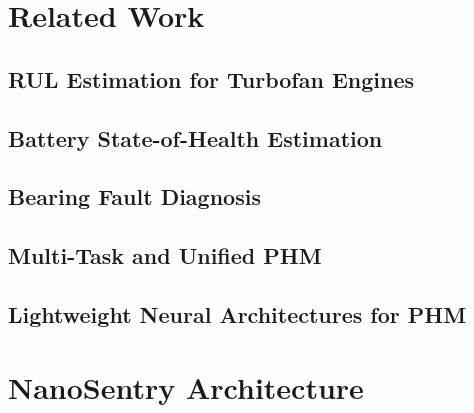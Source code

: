 \documentclass[AMA,Times1COL]{WileyNJDv5}
\begin{document}
\section{Related Work}\label{sec:related}

\subsection{RUL Estimation for Turbofan Engines}\label{sec:related:rul}

\subsection{Battery State-of-Health Estimation}\label{sec:related:battery}

\subsection{Bearing Fault Diagnosis}\label{sec:related:bearing}

\subsection{Multi-Task and Unified PHM}\label{sec:related:multitask}

\subsection{Lightweight Neural Architectures for PHM}\label{sec:related:efficient}

\section{NanoSentry Architecture}\label{sec:arch}
\end{document}

